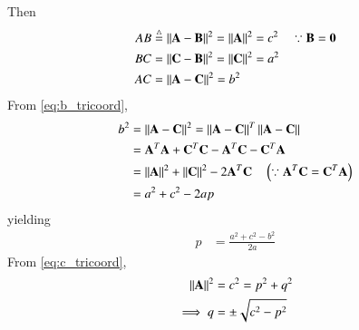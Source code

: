 \begin{enumerate}[label=\arabic*.,ref=\thesubsection.\theenumi]
Then
\begin{align}
\label{eq:c_tricoord}
AB &\stackrel{\triangle}{=} \left\lVert\mathbf{A}-\mathbf{B}\right\rVert^2 = \left\lVert\mathbf{A}\right\rVert^2  = c^2 \quad \because \mathbf{B} = \mathbf{0}
\\
\label{eq:a_tricoord}
BC &= \left\lVert\mathbf{C}-\mathbf{B}\right\rVert^2 = \left\lVert\mathbf{C}\right\rVert^2  = a^2
\\
AC &= \left\lVert\mathbf{A}-\mathbf{C}\right\rVert^2 =    b^2
\label{eq:b_tricoord}
\end{align}
%
From \eqref{eq:b_tricoord},
\begin{align}
b^2 &=\left\lVert\mathbf{A}-\mathbf{C}\right\rVert^2 = \left\lVert\mathbf{A}-\mathbf{C}\right\rVert^T\left\lVert\mathbf{A}-\mathbf{C}\right\rVert  
\\
&= \mathbf{A}^T\mathbf{A}+\mathbf{C}^T\mathbf{C}-\mathbf{A}^T\mathbf{C} - \mathbf{C}^T\mathbf{A} 
\\
&= \left\lVert\mathbf{A}\right\rVert^2 + \left\lVert\mathbf{C}\right\rVert^2 - 2\mathbf{A}^T\mathbf{C} \quad \left(\because \mathbf{A}^T\mathbf{C} = \mathbf{C}^T\mathbf{A} \right) 
\label{eq:tri_const_norm_ac}
\\
&= a^2+c^2-2ap
\end{align}
%
yielding
\begin{align}
p&= \frac{a^2+c^2-b^2}{2a}
\end{align}
%
From \eqref{eq:c_tricoord}, 
\begin{align}
\left\lVert\mathbf{A}\right\rVert^2 &= c^2 = p^2+q^2
\\
\implies q&= \pm \sqrt{c^2-p^2}
\end{align}


\end{enumerate}
